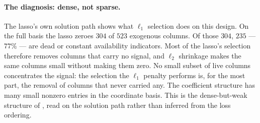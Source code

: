 \paragraph{The diagnosis: dense, not sparse.}\label{sec:dense_weak_diagnosis}
The lasso's own solution path shows what $\ell_1$ selection does on this
design. On the full basis the lasso zeroes $304$ of $523$ exogenous columns.
Of those $304$, $235$ --- $77\%$ --- are dead or constant availability
indicators. Most of the lasso's selection therefore removes columns that
carry no signal, and $\ell_2$ shrinkage makes the same columns small
without making them zero. No small subset of live columns concentrates
the signal: the selection the $\ell_1$ penalty performs is, for the most
part, the removal of columns that never carried any. The coefficient
structure has many small nonzero entries in the coordinate basis. This is
the dense-but-weak structure of \citet{GiannoneLenzaPrimiceri2021}, read
on the solution path rather than inferred from the loss ordering.

